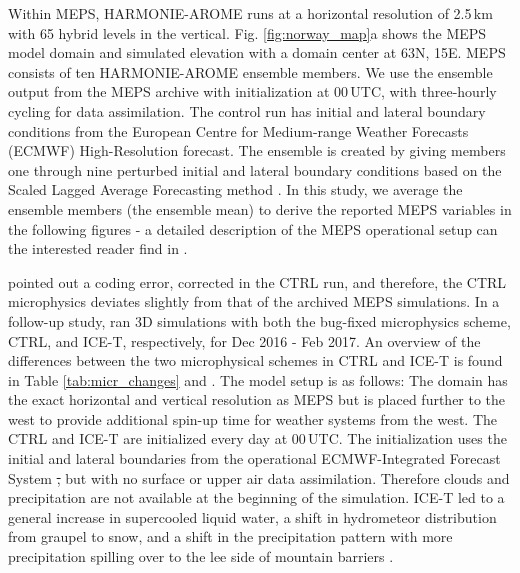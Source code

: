 \documentclass{ametsocV5}
\providecommand{\DIFdel}[1]{{\protect\color{red}\sout{#1}}}                      %
\providecommand{\DIFdelbegin}{} %
\providecommand{\DIFdelend}{} %
\newcommand{\DIFscaledelfig}{0.5}
\newlength{\DIFdelgraphicswidth} %
\newlength{\DIFdelgraphicsheight} %
\newcommand{\DIFdelincludegraphics}[2][]{%
\sbox{\DIFdelgraphicsbox}{\DIFOincludegraphics[#1]{#2}}%
\settoboxwidth{\DIFdelgraphicswidth}{\DIFdelgraphicsbox} %
\settoboxtotalheight{\DIFdelgraphicsheight}{\DIFdelgraphicsbox} %
\scalebox{\DIFscaledelfig}{%
\parbox[b]{\DIFdelgraphicswidth}{\usebox{\DIFdelgraphicsbox}\\[-\baselineskip] \rule{\DIFdelgraphicswidth}{0em}}\llap{\resizebox{\DIFdelgraphicswidth}{\DIFdelgraphicsheight}{%
\setlength{\unitlength}{\DIFdelgraphicswidth}%
\begin{picture}(1,1)%
\thicklines\linethickness{2pt} %
{\color[rgb]{1,0,0}\put(0,0){\framebox(1,1){}}}%
{\color[rgb]{1,0,0}\put(0,0){\line( 1,1){1}}}%
{\color[rgb]{1,0,0}\put(0,1){\line(1,-1){1}}}%
\end{picture}%
}\hspace*{3pt}}} %
} %
\DeclareRobustCommand{\DIFdelbegin}{\DIFOdelbegin \let\includegraphics\DIFdelincludegraphics} %
\DeclareRobustCommand{\DIFdelend}{\DIFOaddend \let\includegraphics\DIFOincludegraphics} %
\begin{document}
		Within MEPS, HARMONIE-AROME runs at a horizontal resolution of 2.5\,km with 65 hybrid levels in the vertical. Fig. \ref{fig:norway_map}a shows the MEPS model domain and simulated elevation with a domain center at 63\textdegree N, 15\textdegree E. MEPS consists of ten HARMONIE-AROME ensemble members. We use the ensemble output from the MEPS archive with initialization at 00\,UTC, with three-hourly cycling for data assimilation. The control run has initial and lateral boundary conditions from the European Centre for Medium-range Weather Forecasts (ECMWF) High-Resolution forecast. The ensemble is created by giving members one through nine perturbed initial and lateral boundary conditions based on the Scaled Lagged Average Forecasting method \citep{koltzow_metcoop_2017}. In this study, we average the ensemble members (the ensemble mean) to derive the reported MEPS variables in the following figures - a detailed description of the MEPS operational setup can the interested reader find in \citet{frogner_convection-permitting_2019}. 

	 	\citet{engdahl_effects_2020} pointed out a coding error, corrected in the CTRL run, and therefore, the CTRL microphysics deviates slightly from that of the archived MEPS simulations. In a follow-up study, \citet{engdahl_effects_2020} ran 3D simulations with both the bug-fixed microphysics scheme, CTRL, and ICE-T, respectively, for Dec 2016 - Feb 2017. An overview of the differences between the two microphysical schemes in CTRL and ICE-T is found in Table \ref{tab:micr_changes} and \citet{engdahl_improving_2020}. The \citet{engdahl_effects_2020} model setup is as follows: The domain has the exact horizontal and vertical resolution as MEPS but is placed further to the west to provide additional spin-up time for weather systems from the west. The CTRL and ICE-T are initialized every day at 00\,UTC. The initialization uses the initial and lateral boundaries from the operational ECMWF-Integrated Forecast System \DIFdelbegin \DIFdel{, }\DIFdelend but with no surface or upper air data assimilation. Therefore clouds and precipitation are not available at the beginning of the simulation. ICE-T led to a general increase in supercooled liquid water, a shift in hydrometeor distribution from graupel to snow, and a shift in the precipitation pattern with more precipitation spilling over to the lee side of mountain barriers \citep{engdahl_effects_2020}.

		
		
\end{document}
